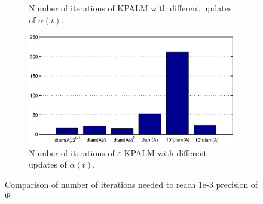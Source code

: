 \documentclass[11pt]{article}
\numberwithin{equation}{section}
\begin{document}
\begin{figure}[ht]
\begin{subfigure}[b]{0.8\textwidth}
        \caption{Number of iterations of KPALM with different updates of $\alpha(t)$.}
        \label{fig:iters_dyn_alpha_kpalm_comp}
    \end{subfigure}
    \begin{subfigure}[b]{0.8\textwidth}
        \includegraphics[width=\textwidth]{iterations_dynamic_alpha_eps_kpalm_comparison}
        \caption{Number of iterations of $\varepsilon$-KPALM with different updates of $\alpha(t)$.}
        \label{fig:iters_dyn_alpha_eps_kpalm_comp}
    \end{subfigure}
    \caption{Comparison of number of iterations needed to reach 1e-3 precision of $\Psi$.}\label{fig:iters_comp}
\end{figure}
\end{document}
